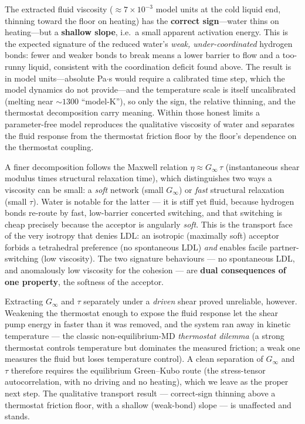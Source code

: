 \documentclass[11pt]{article}
\begin{document}
The extracted fluid viscosity ($\approx 7\times10^{-3}$ model units at the cold liquid end,
thinning toward the floor on heating) has the \textbf{correct sign}---water thins on
heating---but a \textbf{shallow slope}, i.e.\ a small apparent activation energy. This is the
expected signature of the reduced water's \emph{weak, under-coordinated} hydrogen bonds: fewer
and weaker bonds to break means a lower barrier to flow and a too-runny liquid, consistent
with the coordination deficit found above. The result is in model units---absolute
Pa$\cdot$s would require a calibrated time step, which the model dynamics do not provide---and
the temperature scale is itself uncalibrated (melting near $\sim\!1300$ ``model-K''), so only
the sign, the relative thinning, and the thermostat decomposition carry meaning. Within those
honest limits a parameter-free model reproduces the qualitative viscosity of water and separates
the fluid response from the thermostat friction floor by the floor's dependence on the thermostat
coupling.

A finer decomposition follows the Maxwell relation $\eta \approx G_\infty\,\tau$ (instantaneous
shear modulus times structural relaxation time), which distinguishes two ways a viscosity can be
small: a \emph{soft} network (small $G_\infty$) or \emph{fast} structural relaxation (small
$\tau$). Water is notable for the latter --- it is stiff yet fluid, because hydrogen bonds
re-route by fast, low-barrier concerted switching, and that switching is cheap precisely because
the acceptor is angularly \emph{soft}. This is the transport face of the very isotropy that denies
LDL: an isotropic (maximally soft) acceptor forbids a tetrahedral preference (no spontaneous LDL)
\emph{and} enables facile partner-switching (low viscosity). The two signature behaviours ---
no spontaneous LDL, and anomalously low viscosity for the cohesion --- are \textbf{dual consequences
of one property}, the softness of the acceptor.

Extracting $G_\infty$ and $\tau$ separately under a \emph{driven} shear proved unreliable, however.
Weakening the thermostat enough to expose the fluid response let the shear pump energy in faster
than it was removed, and the system ran away in kinetic temperature --- the classic
non-equilibrium-MD \emph{thermostat dilemma} (a strong thermostat controls temperature but dominates
the measured friction; a weak one measures the fluid but loses temperature control). A clean
separation of $G_\infty$ and $\tau$ therefore requires the equilibrium Green--Kubo route (the
stress-tensor autocorrelation, with no driving and no heating), which we leave as the proper next
step. The qualitative transport result --- correct-sign thinning above a thermostat friction floor,
with a shallow (weak-bond) slope --- is unaffected and stands.
\end{document}
